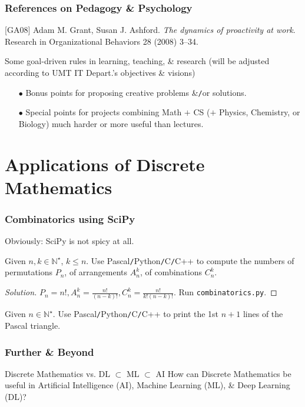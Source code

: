 \documentclass{beamer}
\begin{document}
\begin{frame}
	\frametitle{References on Pedagogy \& Psychology}
	[GA08] {\sc Adam M. Grant, Susan J. Ashford}. {\it The dynamics of proactivity at work}. Research in Organizational Behaviors 28 (2008) 3--34.
	\begin{block}{Some goal-driven rules in learning, teaching, \& research}
		(will be adjusted according to UMT IT Depart.'s objectives \& visions)
		\begin{itemize}
			\item[$\bullet$] Bonus points for proposing creative problems \&{\tt/}or solutions.
			\item[$\bullet$] Special points for projects combining Math $+$ CS ($+$ Physics, Chemistry, or Biology) much harder or more useful than lectures.
		\end{itemize}
	\end{block}
\end{frame}

\section{Applications of Discrete Mathematics}

\begin{frame}
	\frametitle{Combinatorics using SciPy}
	Obviously: SciPy is not spicy at all.
	\begin{problem}
		Given $n,k\in\mathbb{N}^\star$, $k\le n$. Use {\sf Pascal{\tt/}Python{\tt/}C{\tt/}C++} to compute the numbers of permutations $P_n$, of arrangements $A_n^k$, of combinations $C_n^k$.
	\end{problem}
	
	\begin{proof}[Solution]
		$P_n = n!,A_n^k = \frac{n!}{(n - k)!},C_n^k = \frac{n!}{k!(n - k)!}$. Run {\tt combinatorics.py}.		
	\end{proof}
	
	\begin{problem}
		Given $n\in\mathbb{N}^\star$. Use {\sf Pascal{\tt/}Python{\tt/}C{\tt/}C++} to print the 1st $n + 1$ lines of the Pascal triangle.
	\end{problem}
\end{frame}

\begin{frame}
	\frametitle{Further \& Beyond}
	\begin{block}{Discrete Mathematics vs. DL $\subset$ ML $\subset$ AI}
		How can Discrete Mathematics be useful in Artificial Intelligence (AI), Machine Learning (ML), \& Deep Learning (DL)?
	\end{block}
	
\end{frame}
\end{document}

